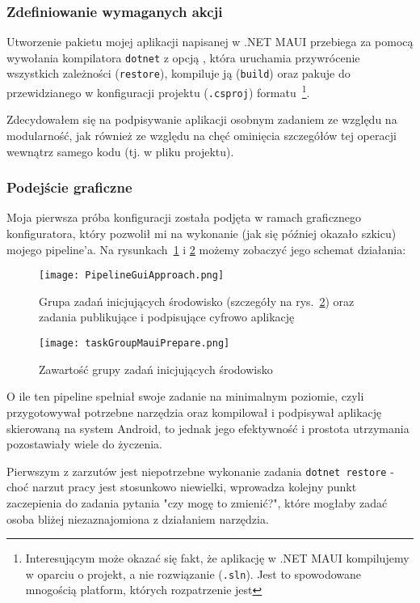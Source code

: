 \subsubsection{Zdefiniowanie wymaganych akcji}
Utworzenie pakietu mojej aplikacji napisanej w .NET MAUI przebiega za pomocą wywołania kompilatora 
\verb|dotnet| z opcją , 
która uruchamia przywrócenie wszystkich zależności (\verb|restore|), 
kompiluje ją (\verb|build|) oraz pakuje do przewidzianego w konfiguracji projektu (\verb|.csproj|) formatu~\cprotect\footnote{%
    Interesującym może okazać się fakt, że aplikację w .NET MAUI kompilujemy w oparciu o projekt, a nie rozwiązanie (\verb|.sln|).
    Jest to spowodowane mnogością platform, których rozpatrzenie jest 
}.

Zdecydowałem się na podpisywanie aplikacji osobnym zadaniem ze względu na modularność,
jak również ze względu na chęć ominięcia szczegółów tej operacji wewnątrz samego kodu (tj. w pliku projektu).

\subsubsection{Podejście graficzne}
Moja pierwsza próba konfiguracji została podjęta w ramach graficznego konfiguratora, 
który pozwolił mi na wykonanie (jak się później okazało szkicu) mojego pipeline'a.
Na rysunkach~\ref{img:PipelineGuiApproach} i \ref{img:taskGroupMauiPrepare} możemy zobaczyć jego schemat działania:\\
\begin{figure}
    \centering
    \texttt{[image: PipelineGuiApproach.png]}
    \caption{Grupa zadań inicjujących środowisko (szczegóły na rys.~\ref{img:taskGroupMauiPrepare}) oraz zadania publikujące i podpisujące cyfrowo aplikację}
    \label{img:PipelineGuiApproach}
\end{figure}
\begin{figure}
    \centering
    \texttt{[image: taskGroupMauiPrepare.png]}
    \caption{Zawartość grupy zadań inicjujących środowisko}
    \label{img:taskGroupMauiPrepare}
\end{figure}
\newpage
O ile ten pipeline spełniał swoje zadanie na minimalnym poziomie, czyli przygotowywał potrzebne narzędzia 
oraz kompilował i podpisywał aplikację skierowaną na system Android, to jednak jego efektywność i prostota 
utrzymania pozostawiały wiele do życzenia.

Pierwszym z zarzutów jest niepotrzebne wykonanie zadania \verb|dotnet restore| - choć narzut pracy 
jest stosunkowo niewielki, wprowadza kolejny punkt zaczepienia do zadania pytania "czy mogę to zmienić?", 
które mogłaby zadać osoba bliżej niezaznajomiona z działaniem narzędzia.


